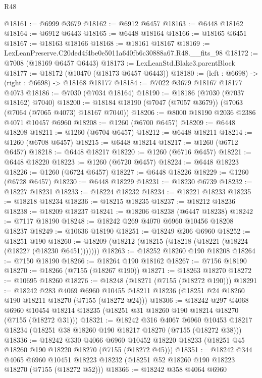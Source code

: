 \begin{lexlean}{R48}
\begin{coremodule}
@18161 := @6999 @3679
@18162 := @6912 @6457
@18163 := @6448 @18162
@18164 := @6912 @6443
@18165 := @6448 @18164
@18166 := @18165 @6451
@18167 := @18163 @18166
@18168 := @18161 @18167
@18169 := LexLeanPreserve.C20ded4f4be0e5011a640fb6c30888a67.R48.__fits_98
@18172 := @7008 (@18169 @6457 @6443)
@18173 := LexLeanStd.Blake3.parentBlock
@18177 := @18172 (@10470 (@18173 @6457 @6443))
@18180 := (left : @6698) -> (right : @6698) -> @18168 @18177
@18184 := @7022 @3679 @18167 @18177 @4073
@18186 := @7030 (@7034 @18164)
@18190 := @18186 (@7030 (@7037 @18162) @7040)
@18200 := @18184 @18190 (@7047 (@7057 @3679)) (@7063 (@7064 (@7065 @4073) @18167 @7040))
@18206 := @8000 @18190 @2036 @2386 @4071 @10457 @6960
@18208 := @1260 (@6700 @6457)
@18209 := @6448 @18208
@18211 := @1260 (@6704 @6457)
@18212 := @6448 @18211
@18214 := @1260 (@6708 @6457)
@18215 := @6448 @18214
@18217 := @1260 (@6712 @6457)
@18218 := @6448 @18217
@18220 := @1260 (@6716 @6457)
@18221 := @6448 @18220
@18223 := @1260 (@6720 @6457)
@18224 := @6448 @18223
@18226 := @1260 (@6724 @6457)
@18227 := @6448 @18226
@18229 := @1260 (@6728 @6457)
@18230 := @6448 @18229
@18231 := @18230 @6739
@18232 := @18227 @18231
@18233 := @18224 @18232
@18234 := @18221 @18233
@18235 := @18218 @18234
@18236 := @18215 @18235
@18237 := @18212 @18236
@18238 := @18209 @18237
@18241 := @18206 @18238 (@6447 @18238)
@18242 := @7117 @18190
@18248 := @18242 @269 @4070 @6960 @10456 @18208 @18237
@18249 := @10636 @18190
@18251 := @18249 @206 @6960
@18252 := @18251 @190
@18260 := @18209 (@18212 (@18215 (@18218 (@18221 (@18224 (@18227 (@18230 @6451)))))))
@18263 := @18252 @18260 @190 @18208
@18264 := @7150 @18190
@18266 := @18264 @190 @18162
@18267 := @7156 @18190
@18270 := @18266 (@7155 (@18267 @190))
@18271 := @18263 @18270
@18272 := @10695 @18260
@18276 := @18248 (@18271 (@7155 (@18272 @190)))
@18291 := @18242
    @283
    @4069
    @6960
    @10455
    @18211
    @18236
    (@18251 @24 @18260 @190 @18211 @18270 (@7155 (@18272 @24)))
@18306 := @18242
    @297
    @4068
    @6960
    @10454
    @18214
    @18235
    (@18251 @31 @18260 @190 @18214 @18270 (@7155 (@18272 @31)))
@18321 := @18242
    @316
    @4067
    @6960
    @10453
    @18217
    @18234
    (@18251 @38 @18260 @190 @18217 @18270 (@7155 (@18272 @38)))
@18336 := @18242
    @330
    @4066
    @6960
    @10452
    @18220
    @18233
    (@18251 @45 @18260 @190 @18220 @18270 (@7155 (@18272 @45)))
@18351 := @18242
    @344
    @4065
    @6960
    @10451
    @18223
    @18232
    (@18251 @52 @18260 @190 @18223 @18270 (@7155 (@18272 @52)))
@18366 := @18242
    @358
    @4064
    @6960

\end{coremodule}
\end{lexlean}
